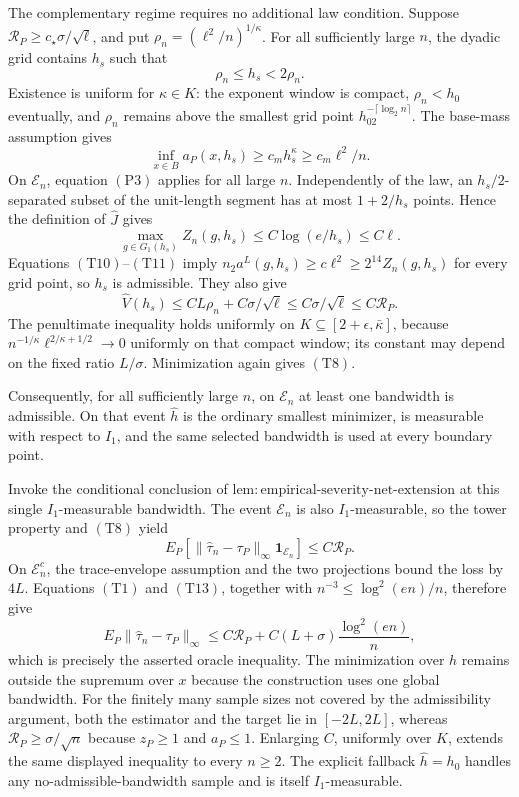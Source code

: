 The complementary regime requires no additional law condition.  Suppose
\(\mathcal R_P\geq c_\star\sigma/\sqrt\ell\), and put
\(\rho_n=(\ell^2/n)^{1/\kappa}\).  For all sufficiently large \(n\), the
dyadic grid contains \(h_s\) such that
\[
 \rho_n\leq h_s<2\rho_n.
 \tag{T9}
\]
Existence is uniform for \(\kappa\in K\): the exponent window is compact,
\(\rho_n<h_0\) eventually, and \(\rho_n\) remains above the smallest grid
point \(h_02^{-\lceil\log_2n\rceil}\).  The base-mass assumption gives
\[
 \inf_{x\in B}a_P(x,h_s)\geq c_mh_s^\kappa
 \geq c_m\ell^2/n.
 \tag{T10}
\]
On \(\mathcal E_n\), equation \((\mathrm{P3})\) applies for all large
\(n\).  Independently of the law, an \(h_s/2\)-separated subset of the
unit-length segment has at most \(1+2/h_s\) points.  Hence the definition of
\(\widehat J\) gives
\[
 \max_{g\in G_1(h_s)}Z_n(g,h_s)
 \leq C\log(e/h_s)\leq C\ell.
 \tag{T11}
\]
Equations \((\mathrm{T10})\)--\((\mathrm{T11})\) imply
\(n_2a^L(g,h_s)\geq c\ell^2\geq2^{14}Z_n(g,h_s)\) for every grid point,
so \(h_s\) is admissible.  They also give
\[
 \widehat V(h_s)
 \leq CL\rho_n+C\sigma/\sqrt\ell
 \leq C\sigma/\sqrt\ell
 \leq C\mathcal R_P.
 \tag{T12}
\]
The penultimate inequality holds uniformly on
\(K\subseteq[2+\epsilon,\bar\kappa]\), because
\(n^{-1/\kappa}\ell^{2/\kappa+1/2}\to0\) uniformly on that compact window;
its constant may depend on the fixed ratio \(L/\sigma\).  Minimization again
gives \((\mathrm{T8})\).

Consequently, for all sufficiently large \(n\), on \(\mathcal E_n\) at
least one bandwidth is admissible.  On that event \(\widehat h\) is the
ordinary smallest minimizer, is measurable with respect to \(I_1\), and the
same selected bandwidth is used at every boundary point.

Invoke the conditional conclusion of
\(\mathrm{lem{:}empirical\text{-}severity\text{-}net\text{-}extension}\)
at this single \(I_1\)-measurable bandwidth.  The event \(\mathcal E_n\) is
also \(I_1\)-measurable, so the tower property and \((\mathrm{T8})\) yield
\[
 E_P\!\left[\|\widehat\tau_n-\tau_P\|_\infty
 \mathbf1_{\mathcal E_n}\right]
 \leq C\mathcal R_P.
 \tag{T13}
\]
On \(\mathcal E_n^c\), the trace-envelope assumption and the two
projections bound the loss by \(4L\).  Equations \((\mathrm{T1})\) and
\((\mathrm{T13})\), together with
\(n^{-3}\leq\log^2(en)/n\), therefore give
\[
 E_P\|\widehat\tau_n-\tau_P\|_\infty
 \leq C\mathcal R_P+C(L+\sigma)\frac{\log^2(en)}{n},
\]
which is precisely the asserted oracle inequality.  The minimization over
\(h\) remains outside the supremum over \(x\) because the construction uses
one global bandwidth.  For the finitely many sample sizes not covered by the
admissibility argument, both the estimator and the target lie in
\([-2L,2L]\), whereas \(\mathcal R_P\geq\sigma/\sqrt n\) because
\(z_P\geq1\) and \(a_P\leq1\).  Enlarging \(C\), uniformly over \(K\),
extends the same displayed inequality to every \(n\geq2\).  The explicit
fallback \(\widehat h=h_0\) handles any no-admissible-bandwidth sample and
is itself \(I_1\)-measurable.

